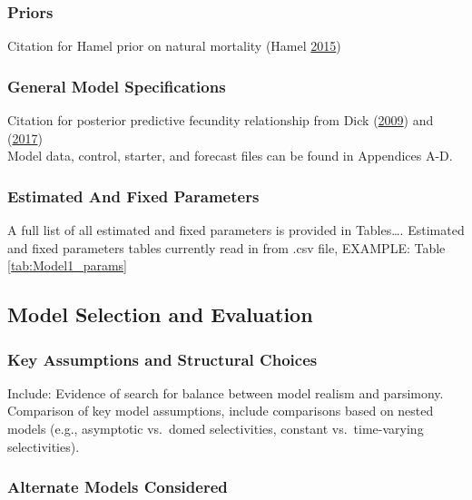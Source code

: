 \documentclass[12pt,]{article}
\begin{document}
\subsubsection{Priors}\label{priors}

Citation for Hamel prior on natural mortality (Hamel
\protect\hyperlink{ref-hamel_method_2015}{2015})

\subsubsection{General Model
Specifications}\label{general-model-specifications}

Citation for posterior predictive fecundity relationship from Dick
(\protect\hyperlink{ref-dick_modeling_2009}{2009}) and
(\protect\hyperlink{ref-dick_meta-analysis_2017}{2017})\\
Model data, control, starter, and forecast files can be found in
Appendices A-D.

\subsubsection{Estimated And Fixed
Parameters}\label{estimated-and-fixed-parameters}

A full list of all estimated and fixed parameters is provided in
Tables\ldots{}. Estimated and fixed parameters tables currently read in
from .csv file, EXAMPLE: Table \ref{tab:Model1_params}

\subsection{Model Selection and
Evaluation}\label{model-selection-and-evaluation}

\subsubsection{Key Assumptions and Structural
Choices}\label{key-assumptions-and-structural-choices}

Include: Evidence of search for balance between model realism and
parsimony.\\
Comparison of key model assumptions, include comparisons based on nested
models (e.g., asymptotic vs.~domed selectivities, constant
vs.~time-varying selectivities).

\subsubsection{Alternate Models
Considered}\label{alternate-models-considered}
\end{document}
